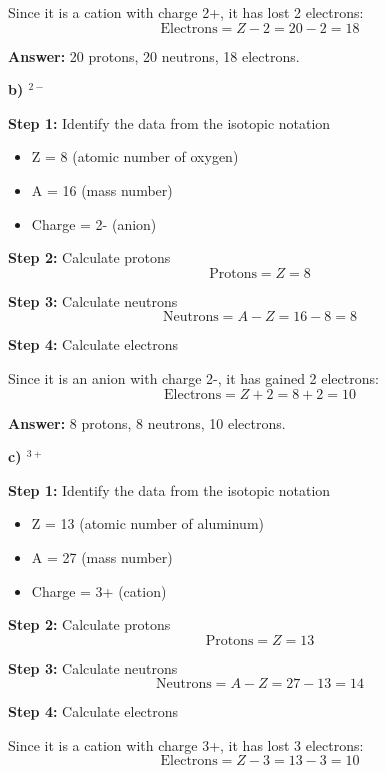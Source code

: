 \begin{exercise}
\begin{solu}
        Since it is a cation with charge 2+, it has lost 2 electrons:
        \[
            \text{Electrons} = Z - 2 = 20 - 2 = 18
        \]

        \textbf{Answer:} 20 protons, 20 neutrons, 18 electrons.

        \textbf{b) $^{2-}$}

        \textbf{Step 1:} Identify the data from the isotopic notation
        \begin{itemize}
            \item Z = 8 (atomic number of oxygen)
            \item A = 16 (mass number)
            \item Charge = 2- (anion)
        \end{itemize}

        \textbf{Step 2:} Calculate protons
        \[
            \text{Protons} = Z = 8
        \]

        \textbf{Step 3:} Calculate neutrons
        \[
            \text{Neutrons} = A - Z = 16 - 8 = 8
        \]

        \textbf{Step 4:} Calculate electrons

        Since it is an anion with charge 2-, it has gained 2 electrons:
        \[
            \text{Electrons} = Z + 2 = 8 + 2 = 10
        \]

        \textbf{Answer:} 8 protons, 8 neutrons, 10 electrons.

        \textbf{c) $^{3+}$}

        \textbf{Step 1:} Identify the data from the isotopic notation
        \begin{itemize}
            \item Z = 13 (atomic number of aluminum)
            \item A = 27 (mass number)
            \item Charge = 3+ (cation)
        \end{itemize}

        \textbf{Step 2:} Calculate protons
        \[
            \text{Protons} = Z = 13
        \]

        \textbf{Step 3:} Calculate neutrons
        \[
            \text{Neutrons} = A - Z = 27 - 13 = 14
        \]

        \textbf{Step 4:} Calculate electrons

        Since it is a cation with charge 3+, it has lost 3 electrons:
        \[
            \text{Electrons} = Z - 3 = 13 - 3 = 10
        \]


\end{solu}
\end{exercise}
